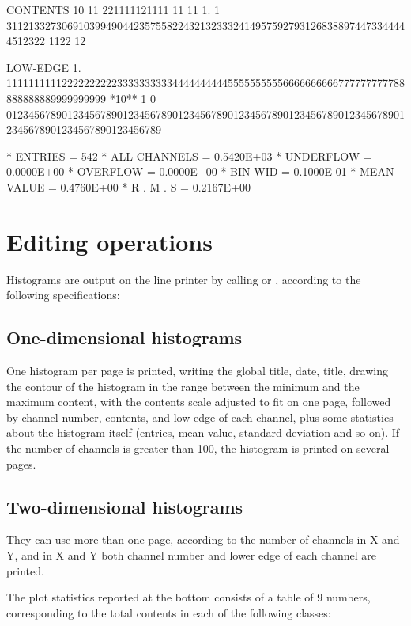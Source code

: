 \begin{Listing}
 CONTENTS  10                        11  221111121111                             11 11                             
            1.            1 3112133273069103994904423575582243213233324149575927931268388974473344444512322 1122 12 
 
 LOW-EDGE   1.            111111111122222222223333333333444444444455555555556666666666777777777788888888889999999999
 *10**  1   0   0123456789012345678901234567890123456789012345678901234567890123456789012345678901234567890123456789
 
 * ENTRIES =        542      * ALL CHANNELS = 0.5420E+03      * UNDERFLOW = 0.0000E+00      * OVERFLOW = 0.0000E+00
 * BIN WID = 0.1000E-01      * MEAN VALUE   = 0.4760E+00      * R . M . S = 0.2167E+00
\end{Listing}
\finalnewpage

\section{Editing operations}
Histograms are output on the line printer by calling
 or ,
according to the following specifications:
 
\subsection*{One-dimensional histograms}
 
One histogram per page is printed, writing the global title, date,
title, drawing the contour of the histogram in the range between the
minimum and the maximum content, with the contents scale adjusted
to fit on one page,
followed by channel number, contents, and low edge of each channel,
plus some statistics about the histogram itself (entries, mean value,
standard deviation and so on).
If the number of channels is greater than 100,
the histogram is printed on several pages.
 
\subsection*{Two-dimensional histograms}
 
\par They can use more than one page, according to the number of channels
in X and Y, and in X and Y both channel number and lower edge of each
channel are printed.
 
The plot statistics reported at the bottom consists of a table
of 9 numbers, corresponding
to the total contents in each of the following classes:
 
